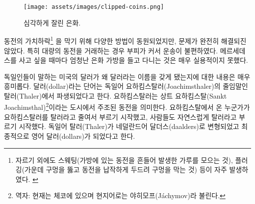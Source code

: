 \begin{figure}
	\texttt{[image: assets/images/clipped-coins.png]}
	\caption{심각하게 잘린 은화.}
	\label{fig:clipped-coins}
\end{figure}

\begin{comment}
	Even with these methods of coin debasement\footnote{Besides clipping, sweating
		(shaking the coins in a bag and collecting the dust worn off) and plugging
		(punching a hole in the middle and hammering the coin flat to close the hole)
		were the most prominent methods of coin debasement. \cite{wiki:coin-debasement}}
	kept in check, coins still suffer from other issues. They are bulky and not very
	convenient to transport, especially when large transfers of value need to
	happen. Showing up with a huge bag of silver dollars every time you want to buy
	a Mercedes isn't very practical.
\end{comment}
동전의 가치하락\footnote{자르기 외에도 스웨팅(가방에 있는 동전을 흔들어 발생한 가루를 모으는 것),
	플러깅(가운데 구멍을 뚫고 동전을 납작하게 두드려 구멍을 막는 것) 등이 자주 발생하였다.
	\cite{wiki:coin-debasement}}
을 막기 위해 다양한 방법이 동원되었지만, 문제가 완전히 해결되진 않았다.
특히 대량의 동전을 거래하는 경우 부피가 커서 운송이 불편하였다.
메르세데스를 사고 싶을 때마다 엄청난 은화 가방을 들고 다니는 것은 매우 실용적이지 못했다.

\begin{comment}
	Speaking of German things: How the United States \textit{dollar} got its name is
	another interesting story. The word \enquote{dollar} is derived from the German word
	\textit{Thaler}, short for a \textit{Joachimsthaler}~\cite{wiki:thaler}. A
	Joachimsthaler was a coin minted in the town of \textit{Sankt Joachimsthal}.
	Thaler is simply a shorthand for someone (or something) coming from the valley,
	and because Joachimsthal was \textit{the} valley for silver coin production,
	people simply referred to these silver coins as \textit{Thaler.} Thaler (German)
	morphed into daalders (Dutch), and finally dollars (English).
\end{comment}
독일인들이 말하는 미국의 달러가 왜 달러라는 이름을 갖게 됐는지에 대한 내용은 매우 흥미롭다.
달러(dollar)라는 단어는 독일어 요하킴스탈러(Joachimsthaler)의 줄임말인 탈러(Thaler)에서 파생되었다고 한다\cite{wiki:thaler}. 
요하킴스탈러는 상트 요하킴스탈(Sankt Joachimsthal)\footnote{역자: 현재는 체코에 있으며 현지어로는 야히모프(Jáchymov)라 불린다.}이라는 도시에서 주조된 동전을 의미한다.
요하킴스탈에서 온 누군가가 요하킴스탈러를 탈러라고 줄여서 부르기 시작했고, 
사람들도 자연스럽게 탈러라고 부르기 시작했다.
독일어 탈러(Thaler)가 네덜란드어 달더스(daalders)로 변형되었고 최종적으로 영어 달러(dollars)가 되었다고 한다.

